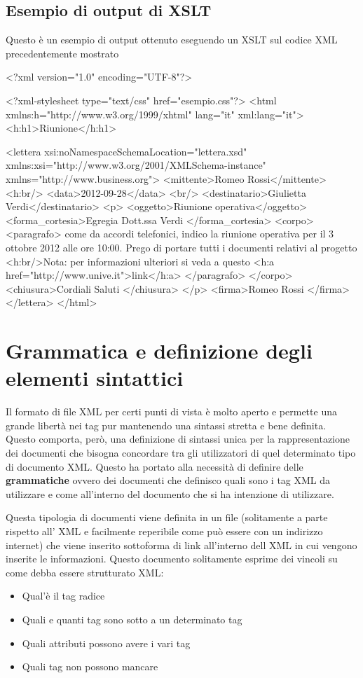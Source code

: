 \documentclass[a4paper,12pt]{report}
\begin{document}
\subsection{Esempio di output di XSLT}
Questo è un esempio di output ottenuto eseguendo un XSLT sul codice XML precedentemente mostrato
\begin{xml}
<?xml version="1.0" encoding="UTF-8"?>

<?xml-stylesheet type="text/css" href="esempio.css"?>
<html xmlns:h="http://www.w3.org/1999/xhtml" lang="it"
 xml:lang="it">
<h:h1>Riunione</h:h1>

<lettera xsi:noNamespaceSchemaLocation="lettera.xsd" 
xmlns:xsi="http://www.w3.org/2001/XMLSchema-instance" 
xmlns="http://www.business.org">
<mittente>Romeo Rossi</mittente><h:br/>
<data>2012-09-28</data>
<br/>
<destinatario>Giulietta Verdi</destinatario>
<p>
<oggetto>Riunione operativa</oggetto>
<forma_cortesia>Egregia Dott.ssa Verdi </forma_cortesia>
<corpo>
<paragrafo>
come da accordi telefonici, indico la riunione operativa 
per il 3 ottobre 2012 alle ore 10:00. 
Prego di portare tutti i documenti relativi al progetto
<h:br/>Nota: per informazioni ulteriori si veda a questo 
<h:a href="http://www.unive.it">link</h:a>
</paragrafo>
</corpo>
<chiusura>Cordiali Saluti
</chiusura>
</p>
<firma>Romeo Rossi
</firma>
</lettera>
</html>

\end{xml}



\section{Grammatica e definizione degli elementi sintattici}
Il formato di file XML per certi punti di vista è molto aperto e permette una grande libertà nei tag pur mantenendo una sintassi stretta e bene definita.
Questo comporta, però, una definizione di sintassi unica per la rappresentazione dei documenti che bisogna concordare tra gli utilizzatori di quel determinato tipo di documento XML. Questo ha portato alla necessità di definire delle \textbf{grammatiche} ovvero dei documenti che definisco quali sono i tag XML da utilizzare e come all'interno del documento che si ha intenzione di utilizzare.


Questa tipologia di documenti viene definita in un file (solitamente a parte rispetto all' XML e facilmente reperibile come può essere con un indirizzo internet) che viene inserito sottoforma di link all'interno dell XML in cui vengono inserite le informazioni. Questo documento solitamente esprime dei vincoli su come debba essere strutturato XML: 
\begin{itemize}
\item Qual'è il tag radice
\item Quali e quanti tag sono sotto a un determinato tag
\item Quali attributi possono avere i vari tag
\item Quali tag non possono mancare 
\end{itemize}
\end{document}
